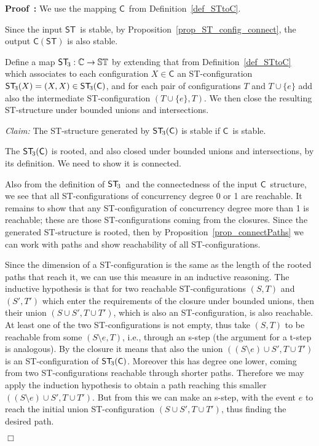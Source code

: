 \documentclass[submission,copyright,creativecommons]{eptcs}
\newenvironment{proof}[1][\!\!\,]{\vspace{1ex}\noindent\textbf{Proof #1: }}{\hfill$\Box$\vspace{2ex}}
\newcommand\C{\ensuremath{\mathsf{C}}}
\newcommand\allC{\ensuremath{\mathbb{C}}}
\newcommand\ST{\ensuremath{\mathsf{ST}}}
\newcommand\allST{\ensuremath{\mathbb{ST}}}
\newcommand\cintostThird{\ensuremath{\mathsf{ST}_{\hspace{-0.4ex}3}}}
\newcommand\stintoc{\ensuremath{\mathsf{C}}}
\begin{document}
\begin{proof}
We use the mapping \stintoc\ from Definition~\ref{def_STtoC}.

Since the input \ST\ is stable, by Proposition~\ref{prop_ST_config_connect}, the output $\C(\ST)$ is also stable.

Define a map $\cintostThird:\allC\rightarrow\allST$ by extending that from Definition~\ref{def_STtoC} which associates to each configuration $X\in\C$ an ST-configuration $\cintostThird(X)=(X,X)\in\cintostThird(\C)$, and for each pair of configurations $T$ and $T\cup\{e\}$ add also the intermediate ST-configuration $(T\cup\{e\},T)$. 
We then close the resulting ST-structure under bounded unions and intersections.


\vspace{1ex}
\noindent\textit{Claim:}\hspace{1ex} The ST-structure generated by $\cintostThird(\C)$ is stable if \C\ is stable.
\vspace{0.5ex}

The $\cintostThird(\C)$ is rooted, and also closed under bounded unions and intersections, by its definition. We need to show it is connected.

Also from the definition of \cintostThird\ and the connectedness of the input \C\ structure, we see that all ST-configurations of concurrency degree 0 or 1 are reachable. It remains to show that any ST-configuration of concurrency degree more than 1 is reachable; these are those ST-configurations coming from the closures. Since the generated ST-structure is rooted, then by Proposition~\ref{prop_connectPaths} we can work with paths and show reachability of all ST-configurations.

Since the dimension of a ST-configuration is the same as the length of the rooted paths that reach it, we can use this measure in an inductive reasoning. The inductive hypothesis is that for two reachable ST-configurations $(S,T)$ and $(S',T')$ which enter the requirements of the closure under bounded unions, then their union $(S\cup S',T\cup T')$, which is also an ST-configuration, is also reachable.
At least one of the two ST-configurations is not empty, thus take $(S,T)$ to be reachable from some $(S\setminus e,T)$, i.e., through an s-step (the argument for a t-step is analogous). By the closure it means that also the union $((S\setminus e)\cup S',T\cup T')$ is an ST-configuration of $\cintostThird(\C)$. Moreover this has degree one lower, coming from two ST-configurations reachable through shorter paths. Therefore we may apply the induction hypothesis to obtain a path reaching this smaller $((S\setminus e)\cup S',T\cup T')$. But from this we can make an s-step, with the event $e$ to reach the initial union ST-configuration $(S\cup S',T\cup T')$, thus finding the desired path.


\end{proof}
\end{document}
